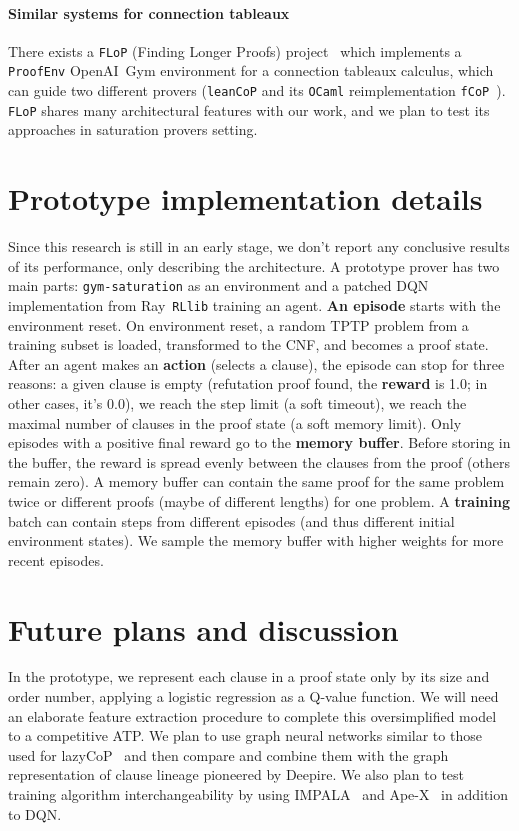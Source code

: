 \documentclass{easychair}
\begin{document}
\paragraph{Similar systems for connection tableaux} There exists a \texttt{FLoP} (Finding Longer Proofs) project~\cite{FLoP} which implements a \texttt{ProofEnv} OpenAI~Gym environment for a connection tableaux calculus, which can guide two different provers (\texttt{leanCoP} and its \texttt{OCaml} reimplementation \texttt{fCoP}~\cite{fCoP}). \texttt{FLoP} shares many architectural features with our work, and we plan to test its approaches in saturation provers setting.

\section{Prototype implementation details}
Since this research is still in an early stage, we don't report any conclusive results of its performance, only describing the architecture. A prototype prover has two main parts: \texttt{gym-saturation} as an environment and a patched DQN~\cite{rainbow} implementation from Ray~\texttt{RLlib} training an agent. \textbf{An episode} starts with the environment reset. On environment reset, a random TPTP problem from a training subset is loaded, transformed to the CNF, and becomes a proof state. After an agent makes an \textbf{action} (selects a clause), the episode can stop for three reasons: a given clause is empty (refutation proof found, the \textbf{reward} is 1.0; in other cases, it's 0.0), we reach the step limit (a soft timeout), we reach the maximal number of clauses in the proof state (a soft memory limit). Only episodes with a positive final reward go to the \textbf{memory buffer}. Before storing in the buffer, the reward is spread evenly between the clauses from the proof (others remain zero). A memory buffer can contain the same proof for the same problem twice or different proofs (maybe of different lengths) for one problem. A \textbf{training} batch can contain steps from different episodes (and thus different initial environment states). We sample the memory buffer with higher weights for more recent episodes.

\section{Future plans and discussion}
In the prototype, we represent each clause in a proof state only by its size and order number, applying a logistic regression as a Q-value function. We will need an elaborate feature extraction procedure to complete this oversimplified model to a competitive ATP. We plan to use graph neural networks similar to those used for lazyCoP~\cite{DBLP:conf/tableaux/RawsonR21} and then compare and combine them with the graph representation of clause lineage pioneered by Deepire. We also plan to test training algorithm interchangeability by using IMPALA~\cite{pmlr-v80-espeholt18a} and Ape-X~\cite{horgan2018distributed} in addition to DQN.
\end{document}
